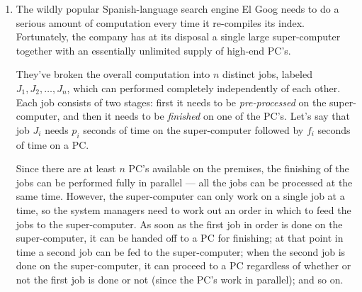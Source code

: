 \documentclass[12pt]{article}
\begin{document}
\begin{enumerate}



\item

The wildly popular Spanish-language search engine El Goog needs to do
a serious amount of computation every time it re-compiles its index.
Fortunately, the company has at its disposal a single large
super-computer together with an essentially unlimited supply
of high-end PC's.

They've broken the overall computation into $n$
distinct jobs, labeled $J_1, J_2, \ldots, J_n$,
which can performed completely independently of each other.
Each job consists of two stages:
first it needs to be {\em pre-processed} on the super-computer,
and then it needs to be {\em finished} on one of the PC's.
Let's say that job $J_i$ needs $p_i$ seconds of
time on the super-computer followed by $f_i$ seconds of time on a PC.

Since there are at least $n$ PC's available on the premises,
the finishing of the jobs can be performed fully in parallel ---
all the jobs can be processed at the same time.
However, the super-computer can only work on a single
job at a time, so the system managers need to work out
an order in which to feed the jobs to the super-computer.
As soon as the first job in order is done on the super-computer,
it can be handed off to a PC for finishing;
at that point in time a second job can be fed to the super-computer;
when the second job is done on the super-computer,
it can proceed to a PC regardless
of whether or not the first job is done or not
(since the PC's work in parallel);
and so on.


\end{enumerate}
\end{document}
